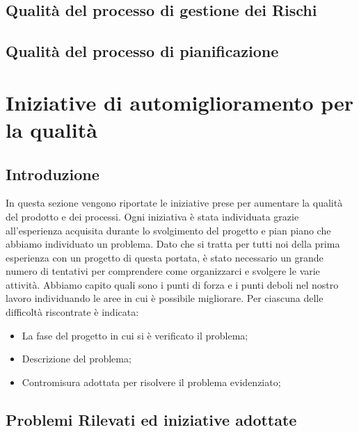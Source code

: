 \documentclass{article}
\begin{document}
\subsection{Qualità del processo di gestione dei Rischi}


\subsection{Qualità del processo di pianificazione}


\section{Iniziative di automiglioramento per la qualità}
\subsection{Introduzione}
In questa sezione vengono riportate le iniziative prese per aumentare la qualità del prodotto e dei processi.
Ogni iniziativa è stata individuata grazie all'esperienza acquisita durante lo svolgimento del progetto e pian piano che abbiamo individuato un problema.
Dato che si tratta per tutti noi della prima esperienza con un progetto di questa portata, è stato necessario un grande numero di tentativi per comprendere come organizzarci e svolgere le varie attività.
Abbiamo capito quali sono i punti di forza e i punti deboli nel nostro lavoro individuando le aree in cui è possibile migliorare. Per ciascuna delle difficoltà riscontrate è indicata:
\begin{itemize}
    \item La fase del progetto in cui si è verificato il problema;
    \item Descrizione del problema;
    \item Contromisura adottata per risolvere il problema evidenziato;
\end{itemize}

\subsection{Problemi Rilevati ed iniziative adottate}
\end{document}
